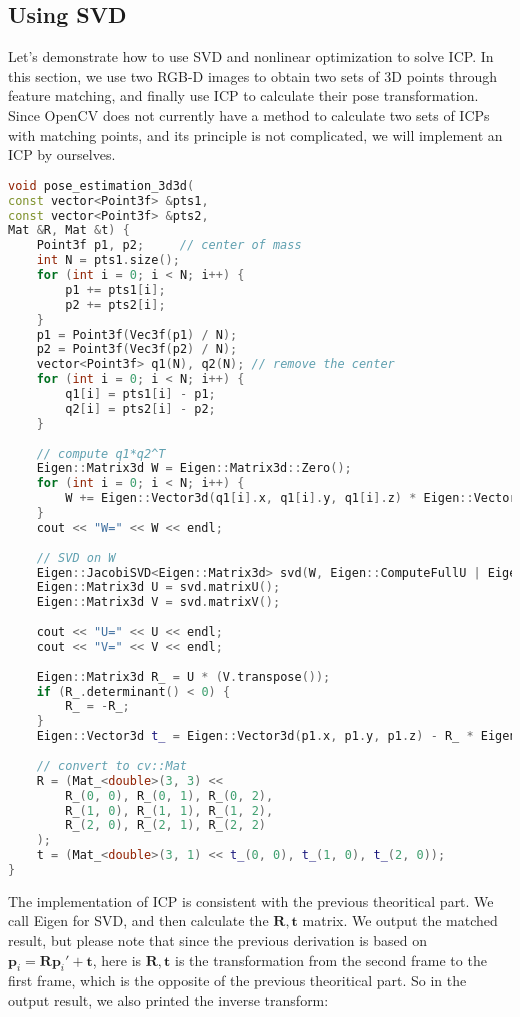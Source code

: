 \subsection{Using SVD}
Let's demonstrate how to use SVD and nonlinear optimization to solve ICP. In this section, we use two RGB-D images to obtain two sets of 3D points through feature matching, and finally use ICP to calculate their pose transformation. Since OpenCV does not currently have a method to calculate two sets of ICPs with matching points, and its principle is not complicated, we will implement an ICP by ourselves.
\begin{lstlisting}[language=c++,caption=slambook2/ch7/pose\_estimation\_3d3d.cpp（片段）]
void pose_estimation_3d3d(
const vector<Point3f> &pts1,
const vector<Point3f> &pts2,
Mat &R, Mat &t) {
	Point3f p1, p2;     // center of mass
	int N = pts1.size();
	for (int i = 0; i < N; i++) {
		p1 += pts1[i];
		p2 += pts2[i];
	}
	p1 = Point3f(Vec3f(p1) / N);
	p2 = Point3f(Vec3f(p2) / N);
	vector<Point3f> q1(N), q2(N); // remove the center
	for (int i = 0; i < N; i++) {
		q1[i] = pts1[i] - p1;
		q2[i] = pts2[i] - p2;
	}
	
	// compute q1*q2^T
	Eigen::Matrix3d W = Eigen::Matrix3d::Zero();
	for (int i = 0; i < N; i++) {
		W += Eigen::Vector3d(q1[i].x, q1[i].y, q1[i].z) * Eigen::Vector3d(q2[i].x, q2[i].y, q2[i].z).transpose();
	}
	cout << "W=" << W << endl;
	
	// SVD on W
	Eigen::JacobiSVD<Eigen::Matrix3d> svd(W, Eigen::ComputeFullU | Eigen::ComputeFullV);
	Eigen::Matrix3d U = svd.matrixU();
	Eigen::Matrix3d V = svd.matrixV();
	
	cout << "U=" << U << endl;
	cout << "V=" << V << endl;
	
	Eigen::Matrix3d R_ = U * (V.transpose());
	if (R_.determinant() < 0) {
		R_ = -R_;
	}
	Eigen::Vector3d t_ = Eigen::Vector3d(p1.x, p1.y, p1.z) - R_ * Eigen::Vector3d(p2.x, p2.y, p2.z);
	
	// convert to cv::Mat
	R = (Mat_<double>(3, 3) <<
		R_(0, 0), R_(0, 1), R_(0, 2),
		R_(1, 0), R_(1, 1), R_(1, 2),
		R_(2, 0), R_(2, 1), R_(2, 2)
	);
	t = (Mat_<double>(3, 1) << t_(0, 0), t_(1, 0), t_(2, 0));
}
\end{lstlisting}

The implementation of ICP is consistent with the previous theoritical part. We call Eigen for SVD, and then calculate the $\bm{R}, \bm{t}$ matrix. We output the matched result, but please note that since the previous derivation is based on $\bm{p}_i = \bm{R} \bm{p}_i' + \bm{t}$, here is $\bm{R}, \bm{t}$ is the transformation from the second frame to the first frame, which is the opposite of the previous theoritical part. So in the output result, we also printed the inverse transform:

